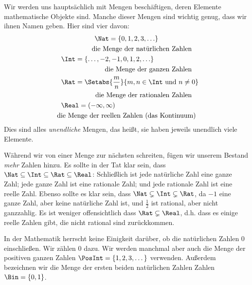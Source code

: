 \documentclass[../../../include/open-logic-section]{subfiles}
\begin{document}

\begin{ex}
Wir werden uns hauptsächlich mit Mengen beschäftigen, deren Elemente
mathematische Objekte sind. Manche dieser Mengen sind wichtig genug,
dass wir ihnen Namen geben. Hier sind vier davon:
\begin{multline*}
    \Nat = \{0, 1, 2, 3, \ldots\} \\
    \shoveright{\text{die Menge der natürlichen Zahlen}} \\
    \shoveleft{\Int = \{\ldots, -2, -1, 0, 1, 2, \ldots\}} \\
    \shoveright{\text{die Menge der ganzen Zahlen}} \\
    \shoveleft{\Rat = \Setabs{\frac{m}{n}}{m, n \in \Int\text{ und }n \neq 0}} \\
    \shoveright{\text{die Menge der rationalen Zahlen}} \\
    \shoveleft{\Real = (-\infty, \infty)} \\
    \text{die Menge der reellen Zahlen (das Kontinuum)} \\
\end{multline*}
Dies sind alles \emph{unendliche} Mengen, das heißt, sie haben jeweils
unendlich viele Elemente.

Während wir von einer Menge zur nächsten schreiten, fügen wir unserem 
Bestand \emph{mehr} Zahlen hinzu.
Es sollte in der Tat klar sein, dass $\Nat \subseteq \Int
\subseteq \Rat \subseteq \Real$: Schließlich ist jede natürliche Zahl eine
ganze Zahl; jede ganze Zahl ist eine rationale Zahl; und jede rationale Zahl ist
eine reelle Zahl.
Ebenso sollte es klar sein, dass $\Nat \subsetneq \Int \subsetneq
\Rat$, da $-1$ eine ganze Zahl, aber keine natürliche Zahl ist, und
$\frac{1}{2}$ ist rational, aber nicht ganzzahlig. Es ist weniger offensichtlich
dass $\Rat \subsetneq \Real$, d.h. dass es einige reelle Zahlen gibt,
die nicht rational sind zurückkommen. 

In der Mathematik herrscht keine Einigkeit
darüber, ob die natürlichen Zahlen $0$ einschließen. Wir zählen $0$ dazu.
Wir werden manchmal aber auch die Menge der positiven ganzen Zahlen $\PosInt = \{1,
2, 3, \dots\}$ verwenden. Außerdem bezeichnen wir die Menge der ersten beiden natürlichen Zahlen
Zahlen $\Bin = \{0, 1\}$.
\end{ex}
\end{document}
